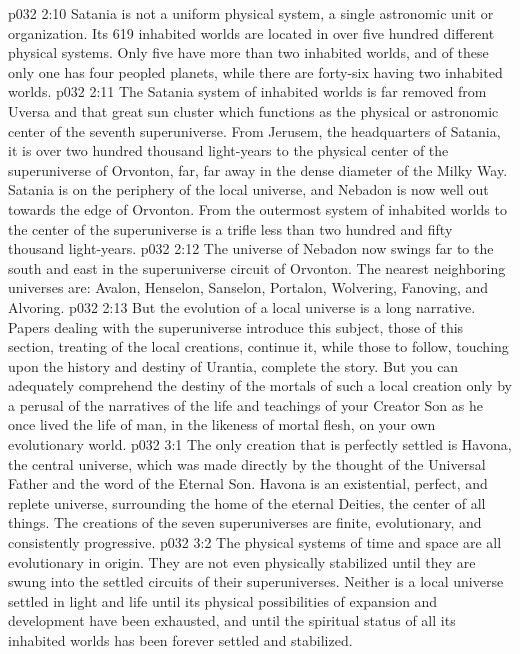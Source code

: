 \vs p032 2:10 Satania is not a uniform physical system, a single astronomic unit or organization. Its 619 inhabited worlds are located in over five hundred different physical systems. Only five have more than two inhabited worlds, and of these only one has four peopled planets, while there are forty\hyp{}six having two inhabited worlds.
\vs p032 2:11 The Satania system of inhabited worlds is far removed from Uversa and that great sun cluster which functions as the physical or astronomic center of the seventh superuniverse. From Jerusem, the headquarters of Satania, it is over two hundred thousand light\hyp{}years to the physical center of the superuniverse of Orvonton, far, far away in the dense diameter of the Milky Way. Satania is on the periphery of the local universe, and Nebadon is now well out towards the edge of Orvonton. From the outermost system of inhabited worlds to the center of the superuniverse is a trifle less than two hundred and fifty thousand light\hyp{}years.
\vs p032 2:12 The universe of Nebadon now swings far to the south and east in the superuniverse circuit of Orvonton. The nearest neighboring universes are: Avalon, Henselon, Sanselon, Portalon, Wolvering, Fanoving, and Alvoring.
\vs p032 2:13 \pc But the evolution of a local universe is a long narrative. Papers dealing with the superuniverse introduce this subject, those of this section, treating of the local creations, continue it, while those to follow, touching upon the history and destiny of Urantia, complete the story. But you can adequately comprehend the destiny of the mortals of such a local creation only by a perusal of the narratives of the life and teachings of your Creator Son as he once lived the life of man, in the likeness of mortal flesh, on your own evolutionary world.
\vs p032 3:1 The only creation that is perfectly settled is Havona, the central universe, which was made directly by the thought of the Universal Father and the word of the Eternal Son. Havona is an existential, perfect, and replete universe, surrounding the home of the eternal Deities, the center of all things. The creations of the seven superuniverses are finite, evolutionary, and consistently progressive.
\vs p032 3:2 The physical systems of time and space are all evolutionary in origin. They are not even physically stabilized until they are swung into the settled circuits of their superuniverses. Neither is a local universe settled in light and life until its physical possibilities of expansion and development have been exhausted, and until the spiritual status of all its inhabited worlds has been forever settled and stabilized.
